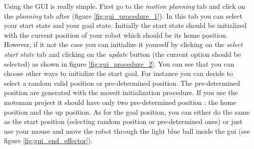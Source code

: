 Using the GUI is really simple. First go to the \emph{motion planning} tab and click on the \emph{planning} tab after (figure \ref{fig:gui_procedure_1}). In this tab you can select your start state and your goal state. Initially the start state should be initialized with the current position of your robot which should be its home position. However, if it not the case you can initialize it yourself by clicking on the \emph{select start state} tab and clicking on the \emph{update} button (the current option should be selected) as shown in figure \ref{fig:gui_procedure_2}. You can see that you can choose other ways to initialize the start goal. For instance you can decide to select a random valid position or pre-determined position. The pre-determined position are generated with the moveit initialization procedure. If you use the motoman project it should have only two pre-determined position : the home position and the up position. As for the goal position, you can either do the same as the start position (selecting random position or pre-determined ones) or just use your mouse and move the robot through the light blue ball inside the gui (see figure \ref{fig:gui_end_effector}). 
